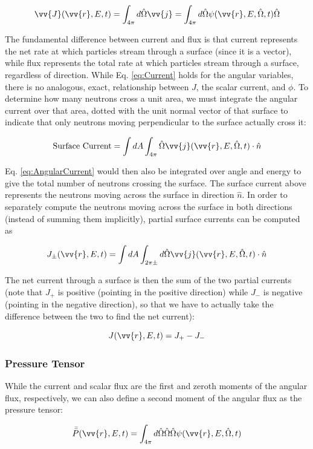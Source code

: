 \documentclass[10pt]{article}
\newcommand{\beq}{\begin{equation}}
\newcommand{\eeq}{\end{equation}}
\newcommand{\hO}{\hat{\Omega}}
\newcommand{\spa}{(\vv{r}, E, \hO, t)}
\newcommand{\spas}{(\vv{r},E,t)}
\begin{document}
\begin{flushleft}
\beq
\label{eq:Current}
\vv{J}(\vv{r},E,t)=\int_{4\pi}^{}d\hO  \vv{j}=\int_{4\pi}^{}d\hO\psi\spa\hO  
\eeq

The fundamental difference between current and flux is that current represents the net rate at which particles stream through a surface (since it is a vector), while flux represents the total rate at which particles stream through a surface, regardless of direction. While Eq. \ref{eq:Current} holds for the angular variables, there is no analogous, exact, relationship between \(J\), the scalar current, and \(\phi\). To determine how many neutrons cross a unit area, we must integrate the angular current over that area, dotted with the unit normal vector of that surface to indicate that only neutrons moving perpendicular to the surface actually cross it:

\beq
\label{eq:AngularCurrent}
\textrm{Surface Current} = \int dA \int_{4\pi}^{}\hO\vv{j}\spa \cdot\hat{n}
\eeq

Eq. \ref{eq:AngularCurrent} would then also be integrated over angle and energy to give the total number of neutrons crossing the surface. The surface current above represents the neutrons moving across the surface in direction \(\hat{n}\). In order to separately compute the neutrons moving across the surface in both directions (instead of summing them implicitly), partial surface currents can be computed as

\beq
\label{eq:PartialCurrent}
J_\pm \spas = \int dA\int_{2\pi\pm}^{} d\hO   \vv{j}\spa \cdot\hat{n}
\eeq

The net current through a surface is then the sum of the two partial currents (note that \(J_+\) is positive (pointing in the positive direction) while \(J_-\) is negative (pointing in the negative direction), so that we have to actually take the difference between the two to find the net current):

\beq
\label{eq:TotalCurrent}
J \spas = J_+ - J_-
\eeq

\subsubsection{Pressure Tensor}

While the current and scalar flux are the first and zeroth moments of the angular flux, respectively, we can also define a second moment of the angular flux as the pressure tensor:

\beq
\label{eq:PressureTensor}
\bar{\bar{P}}(\vv{r},E,t)=\int_{4\pi}^{}d\hO  \hO  \hO  \psi\spa 
\eeq


\end{flushleft}
\end{document}
